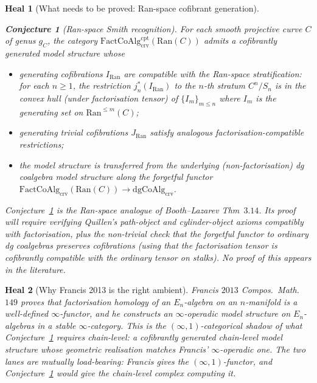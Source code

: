 \documentclass[11pt]{amsart}
\newtheorem*{heal}{Heal}
\newtheorem{conjecture}[theorem]{Conjecture}
\newcommand{\Ran}{\mathrm{Ran}}
\newcommand{\FactCoAlg}{\mathrm{FactCoAlg}}
\newcommand{\crv}{\mathrm{crv}}
\newcommand{\cpt}{\mathrm{cpt}}
\newcommand{\dgCoAlg}{\mathrm{dgCoAlg}}
\begin{document}
\begin{heal}[What needs to be proved: Ran-space cofibrant generation]
\begin{conjecture}[Ran-space Smith recognition]
\label{conj:ran-smith}
For each smooth projective curve $C$ of genus $g_C$, the category
$\FactCoAlg^{\cpt}_{\crv}(\Ran(C))$ admits a cofibrantly generated
model structure whose
\begin{itemize}
\item generating cofibrations $I_{\Ran}$ are compatible with the
Ran-space stratification: for each $n\geq 1$, the restriction
$j^*_n(I_{\Ran})$ to the $n$-th stratum $C^n/S_n$ is in the
convex hull (under factorisation tensor) of $\{I_m\}_{m\leq n}$
where $I_m$ is the generating set on $\Ran^{\leq m}(C)$;
\item generating trivial cofibrations $J_{\Ran}$ satisfy analogous
factorisation-compatible restrictions;
\item the model structure is transferred from the underlying
(non-factorisation) dg coalgebra model structure along the
forgetful functor $\FactCoAlg_{\crv}(\Ran(C))\to\dgCoAlg_{\crv}$.
\end{itemize}
\end{conjecture}
Conjecture~\ref{conj:ran-smith} is the Ran-space analogue of
Booth--Lazarev Thm~$3.14$. Its proof will require verifying Quillen's
path-object and cylinder-object axioms compatibly with factorisation,
plus the non-trivial check that the forgetful functor to ordinary
dg coalgebras preserves cofibrations (using that the factorisation
tensor is cofibrantly compatible with the ordinary tensor on
stalks). No proof of this appears in the literature.
\end{heal}

\begin{heal}[Why Francis 2013 is the right ambient]
Francis $2013$ \emph{Compos.\ Math.}\ $149$ proves that factorisation
homology of an $E_n$-algebra on an $n$-manifold is a well-defined
$\infty$-functor, and he constructs an $\infty$-operadic model structure
on $E_n$-algebras in a stable $\infty$-category. This is the
$(\infty,1)$-categorical shadow of what
Conjecture~\ref{conj:ran-smith} requires chain-level: a cofibrantly
generated chain-level model structure whose geometric realisation
matches Francis' $\infty$-operadic one. The two lanes are mutually
load-bearing: Francis gives the $(\infty,1)$-functor, and
Conjecture~\ref{conj:ran-smith} would give the chain-level complex
computing it.
\end{heal}
\end{document}
